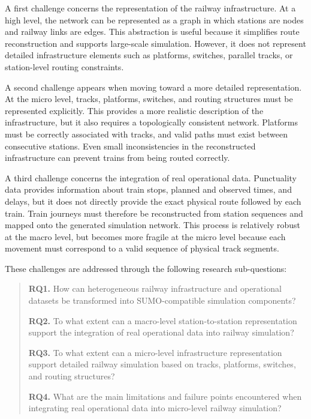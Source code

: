 \newpage

A first challenge concerns the representation of the railway infrastructure. At a high level, the network can be 
represented as a graph in which stations are nodes and railway links are edges. This abstraction is useful because it 
simplifies route reconstruction and supports large-scale simulation. However, it does not represent detailed infrastructure 
elements such as platforms, switches, parallel tracks, or station-level routing constraints.

A second challenge appears when moving toward a more detailed representation. At the micro level, tracks, platforms, 
switches, and routing structures must be represented explicitly. This provides a more realistic description of the 
infrastructure, but it also requires a topologically consistent network. Platforms must be correctly associated with 
tracks, and valid paths must exist between consecutive stations. Even small inconsistencies in the reconstructed 
infrastructure can prevent trains from being routed correctly.

A third challenge concerns the integration of real operational data. Punctuality data provides information about train 
stops, planned and observed times, and delays, but it does not directly provide the exact physical route followed by each 
train. Train journeys must therefore be reconstructed from station sequences and mapped onto the generated simulation 
network. This process is relatively robust at the macro level, but becomes more fragile at the micro level because each 
movement must correspond to a valid sequence of physical track segments.

These challenges are addressed through the following research sub-questions:

\begin{quote}
    \textbf{RQ1.} How can heterogeneous railway infrastructure and operational datasets be transformed into 
    SUMO-compatible simulation components?

    \textbf{RQ2.} To what extent can a macro-level station-to-station representation support the integration of real 
    operational data into railway simulation?

    \textbf{RQ3.} To what extent can a micro-level infrastructure representation support detailed railway simulation based 
    on tracks, platforms, switches, and routing structures?

    \textbf{RQ4.} What are the main limitations and failure points encountered when integrating real operational data into 
    micro-level railway simulation?
\end{quote}

